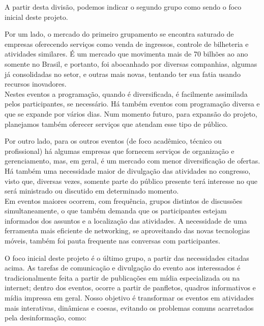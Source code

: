 \documentclass[12pt,a4paper,twoside,hyphens,english,brazil]{abntex2}
\begin{document}
A partir desta divisão, podemos indicar o segundo grupo como sendo o foco inicial deste projeto.

Por um lado, o mercado do primeiro grupamento se encontra saturado de empresas oferecendo serviços como venda de ingressos, controle de bilheteria e atividades similares. É um mercado que movimenta mais de 70 bilhões ao ano somente no Brasil\cite{pegn-mercado-eventos}, e portanto, foi abocanhado por diversas companhias, algumas já consolidadas no setor, e outras mais novas, tentando ter sua fatia usando recursos inovadores.\\
Nestes eventos a programação, quando é diversificada, é facilmente assimilada pelos participantes, se necessário. Há também eventos com programação diversa e que se expande por vários dias. Num momento futuro, para expansão do projeto, planejamos também oferecer serviços que atendam esse tipo de público.

Por outro lado, para os outros eventos (de foco acadêmico, técnico ou profissional) há algumas empresas que fornecem serviços de organização e gerenciamento, mas, em geral, é um mercado com menor diversificação de ofertas. Há também uma necessidade maior de divulgação das atividades no congresso, visto que, diversas vezes, somente parte do público presente terá interesse no que será ministrado ou discutido em determinado momento.\\
Em eventos maiores ocorrem, com frequência, grupos distintos de discussões simultaneamente, o que também demanda que os participantes estejam informados dos assuntos e a localização das atividades. A necessidade de uma ferramenta mais eficiente de networking, se aproveitando das novas tecnologias móveis, também foi pauta frequente nas conversas com participantes.

O foco inicial deste projeto é o último grupo, a partir das necessidades citadas acima. As tarefas de comunicação e divulgação do evento aos interessados é tradicionalmente feita a partir de publicações em mídia especializada ou na internet; dentro dos eventos, ocorre a partir de panfletos, quadros informativos e mídia impressa em geral. Nosso objetivo é transformar os eventos em atividades mais interativas, dinâmicas e coesas, evitando os problemas comuns acarretados pela desinformação, como:
\end{document}
